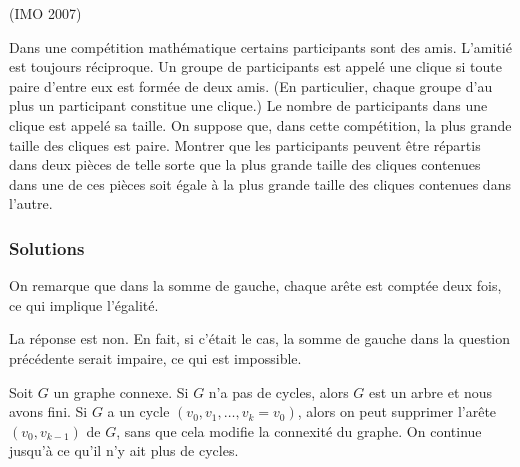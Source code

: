  
\begin{exo} 

(IMO 2007) 

Dans une compétition mathématique certains participants sont des amis. L’amitié est toujours réciproque. Un groupe de participants est appelé une clique si toute paire d’entre eux est formée de deux amis. (En particulier, chaque groupe d’au plus un participant constitue une clique.) Le nombre de participants dans une clique est appelé sa taille. On suppose que, dans cette compétition, la plus grande taille des cliques est paire. Montrer que les participants peuvent être répartis dans deux pièces de telle sorte que la plus grande taille des cliques contenues dans une de ces pièces soit égale à la plus grande taille des cliques contenues dans l’autre. 

\end{exo}




\subsubsection{Solutions}


 
\begin{sol}

On remarque que dans la somme de gauche, chaque arête est comptée deux fois, ce qui implique l’égalité.\\

\end{sol}

\begin{sol}

La réponse est non. En fait, si c’était le cas, la somme de gauche dans la question précédente serait impaire, ce qui est impossible.\\

\end{sol}





\begin{sol}

Soit $G$ un graphe connexe. Si $G$ n'a pas de cycles, alors $G$ est un arbre et nous avons fini. Si $G$ a un cycle $(v_0, v_1,\ldots ,v_k = v_0)$, alors on peut supprimer l'arête $(v_0, v_{k-1})$ de $G$, sans que cela modifie la connexité du graphe. On continue jusqu’à ce qu’il n’y ait plus de cycles.\\

\end{sol}

